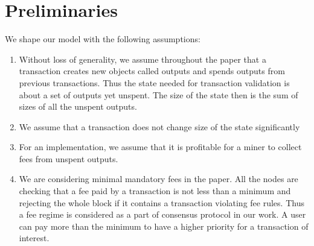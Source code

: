 \documentclass[]{llncs}   %
\begin{document}

\section{Preliminaries}
\label{sec:preliminaries}

We shape our model with the following assumptions:
\begin{enumerate}[label=\textbf{A\arabic*. }]
  \item \label{a:utxo} Without loss of generality, we assume throughout the paper that a transaction creates new objects called outputs and spends outputs from previous transactions. Thus the state needed for transaction validation is about a set of outputs yet unspent. The size of the state then is the sum of sizes of all the unspent outputs.  
  \item \label{a:state} We assume that a transaction does not change size of the state significantly
  \item \label{a:miner} For an implementation, we assume that it is profitable for a miner to collect fees from unspent outputs. 
  \item \label{a:minimal} We are considering minimal mandatory fees in the paper. All the nodes
      are checking that a fee paid by a transaction is not less than a minimum
      and rejecting the whole block if it contains a transaction violating fee
      rules. Thus a fee regime is considered as a part of consensus protocol in
      our work. A user can pay more than the minimum to have a higher priority
      for a transaction of interest.
\end{enumerate}
\end{document}
